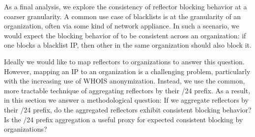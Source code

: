 
As a final analysis, we explore the consistency of reflector blocking
behavior at a coarser granularity.  A common use case of blacklists is
at the granularity of an organization, often via some kind of network
appliance.  In such a scenario, we would expect the blocking behavior
of {} to be consistent across an organization: if one
{} blocks a blacklist IP, then other {} in the
same organization should also block it.

Ideally we would like to map reflectors to organizations to answer
this question.  However, mapping an IP to an organization is a
challenging problem, particularly with the increasing use of WHOIS
anonymization.  Instead, we use the common, more tractable technique
of aggregating reflectors by their /24 prefix.  As a result, in this
section we answer a methodological question: If we aggregate
reflectors by their /24 prefix, do the aggregated reflectors exhibit
consistent blocking behavior?  Is the /24 prefix aggregation a useful
proxy for expected consistent blocking by organizations?


